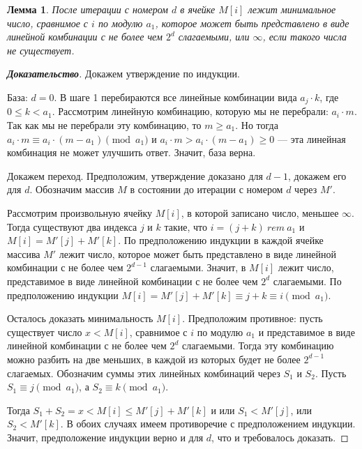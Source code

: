 \documentclass[12pt]{article}
\newtheorem{lemma}[theorem]{Лемма}
\begin{document}
\begin{lemma}
\label{algorithm2:lemma2}
После итерации с номером $d$ в ячейке $M[i]$ лежит минимальное число, сравнимое с $i$ по модулю $a_1$, которое может быть представлено в виде линейной комбинации с не более чем $2^d$ слагаемыми, или $\infty$, если такого числа не существует.
\end{lemma}
\begin{proof}[\textbf{Доказательство}]
Докажем утверждение по индукции.

База: $d = 0$. В шаге 1 перебираются все линейные комбинации вида $a_j \cdot k$, где $0 \le k < a_1$. Рассмотрим линейную комбинацию, которую мы не перебрали: $a_i \cdot m$. Так как мы не перебрали эту комбинацию, то $m \ge a_1$. Но тогда $a_i \cdot m \equiv a_i \cdot (m - a_1) \pmod {a_1}$ и $a_i \cdot m > a_i \cdot (m - a_1) \ge 0$ --- эта линейная комбинация не может улучшить ответ. Значит, база верна.

Докажем переход. Предположим, утверждение доказано для $d - 1$, докажем его для $d$. Обозначим массив $M$ в состоянии до итерации с номером $d$ через $M'$.

Рассмотрим произвольную ячейку $M[i]$, в которой записано число, меньшее $\infty$. Тогда существуют два индекса $j$ и $k$ такие, что $i = (j + k) \ rem \ a_1$ и $M[i] = M'[j] + M'[k]$. По предположению индукции в каждой ячейке массива $M'$ лежит число, которое может быть представлено в виде линейной комбинации с не более чем $2^{d - 1}$ слагаемыми. Значит, в $M[i]$ лежит число, представимое в виде линейной комбинации с не более чем $2^d$ слагаемыми. По предположению индукции $M[i] = M'[j] + M'[k] \equiv j + k \equiv i \pmod{a_1}$.

Осталось доказать минимальность $M[i]$. Предположим противное: пусть существует число $x < M[i]$, сравнимое с $i$ по модулю $a_1$ и представимое в виде линейной комбинации с не более чем $2^d$ слагаемыми. Тогда эту комбинацию можно разбить на две меньших, в каждой из которых будет не более $2^{d - 1}$ слагаемых. Обозначим суммы этих линейных комбинаций через $S_1$ и $S_2$. Пусть $S_1 \equiv j \pmod{a_1}$, а $S_2 \equiv k \pmod{a_1}$.

Тогда $S_1 + S_2 = x < M[i] \le M'[j] + M'[k]$ и или $S_1 < M'[j]$, или $S_2 < M'[k]$. В обоих случаях имеем противоречие с предположением индукции. Значит, предположение индукции верно и для $d$, что и требовалось доказать.
\end{proof}
\end{document}
